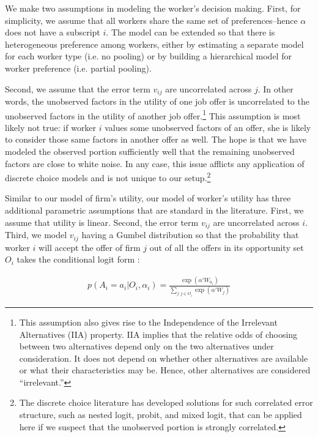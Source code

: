 We make two assumptions in modeling the worker's decision making. First, for
simplicity, we assume that all workers share the same set of preferences--hence
$\alpha$ does not have a subscript $i$. The model can be extended so that there
is heterogeneous preference among workers, either by estimating a separate model
for each worker type (i.e. no pooling) or by building a hierarchical model for
worker preference (i.e. partial pooling).

Second, we assume that the error term $v_{ij}$ are uncorrelated across $j$. In
other words, the unobserved factors in the utility of one job offer is
uncorrelated to the unobserved factors in the utility of another job
offer.\footnote{This assumption also gives rise to the Independence of the
  Irrelevant Alternatives (IIA) property. IIA implies that the relative odds of
  choosing between two alternatives depend only on the two alternatives under
  consideration. It does not depend on whether other alternatives are available
  or what their characteristics may be. Hence, other alternatives are considered
  ``irrelevant.''} This assumption is most likely not true: if worker $i$ values
some unobserved factors of an offer, she is likely to consider those same
factors in another offer as well. The hope is that we have modeled the observed
portion sufficiently well that the remaining unobserved factors are close to
white noise. In any case, this issue afflicts any application of discrete choice
models and is not unique to our setup.\footnote{The discrete choice literature
  has developed solutions for such correlated error structure, such as nested
  logit, probit, and mixed logit, that can be applied here if we suspect that
  the unobserved portion is strongly correlated.}

Similar to our model of firm's utility, our model of worker's utility has three
additional parametric assumptions that are standard in the literature. First, we
assume that utility is linear. Second, the error term $v_{ij}$ are uncorrelated
across $i$. Third, we model $v_{ij}$ having a Gumbel distribution so that the
probability that worker $i$ will accept the offer of firm $j$ out of all the
offers in its opportunity set $O_i$ takes the conditional logit form
\citep{Cameron2005}:

\begin{align}
  p(A_i = a_i | O_i, \alpha_i) = \frac{\exp(\alpha'W_{a_i})}{\sum\limits_{j:j \in O_i} \exp(\alpha'W_j)} \label{eq:conditional_probability_of_accept}
\end{align}

